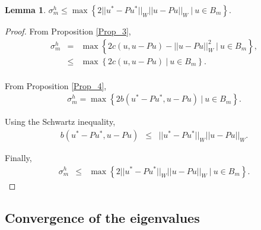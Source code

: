 \documentclass[../../main.tex]{subfiles}
\begin{document}
\newtheorem{Lem_2}[Lem_1]{Lemma} 
\begin{Lem_2}
	\label{Lem_2}
	$\sigma_{m}^{h} \leq \max \left\{2||u^{*}- Pu^{*}||_{W} ||u-Pu||_{W} \ | \ u \in B_{m} \right\}.$
\end{Lem_2}
\begin{proof}
	From Proposition \ref{Prop_3},
	\begin{eqnarray*}
		\sigma_{m}^{h} & = & \max\left\{ 2c( u,u-Pu )-||u-Pu||_{W}^{2} \ | \ u \in B_{m} \right\}, \\
					& \leq & \max\left\{ 2c( u,u-Pu ) \ | \ u \in B_{m} \right\}. \\
	\end{eqnarray*}

	From Proposition \ref{Prop_4}, 
	\begin{eqnarray*}
		\sigma_{m}^{h} = \max\left\{ 2 b(u^{*}-Pu^{*}, u-Pu) \ | \ u \in B_{m} \right\}.
	\end{eqnarray*}

	Using the Schwartz inequality,
	\begin{eqnarray*}
		b(u^{*} - Pu^{*}, u -Pu) & \leq & ||u^{*} - Pu^{*}||_{W}||u -Pu||_{W}.
	\end{eqnarray*}

	Finally,
	\begin{eqnarray*}
		\sigma_{m}^{h} & \leq & \max\left\{ 2||u^{*}- Pu^{*}||_{W} ||u-Pu||_{W} \ | \ u \in B_{m} \right\}.
	\end{eqnarray*}
\end{proof}

\subsection{Convergence of the eigenvalues}
\end{document}
